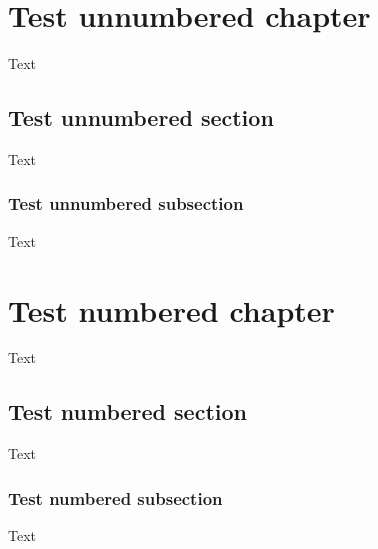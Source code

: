 \documentclass[oneside,openright,BCOR=5mm,paper=a4,fontsize=11pt]{scrbook}
\begin{document}
\tableofcontents

\chapter{Test unnumbered chapter}
Text
\section*{Test unnumbered section}
Text
\subsection*{Test unnumbered subsection}
Text

\chapter{Test numbered chapter}
Text
\section{Test numbered section}
Text
\subsection{Test numbered subsection}
Text
\end{document}
